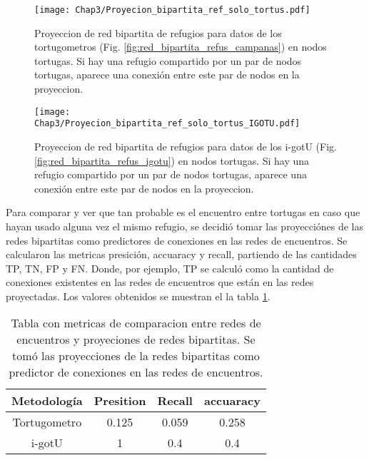 \begin{figure}[ht]
    \begin{center}
        \texttt{[image: Chap3/Proyecion\_bipartita\_ref\_solo\_tortus.pdf]}
        \caption[Proyeccion  de red bipartita de refugios para datos de los tortugometros en nodos tortugas.]{Proyeccion  de red bipartita de refugios para datos de los tortugometros (Fig. \ref{fig:red_bipartita_refus_campanas}) en nodos tortugas. Si hay una refugio compartido por un par de nodos tortugas, aparece una conexión entre este par de nodos en la proyeccion. } 
        \label{fig:proyeccion_red_campanas}
        
        \end{center}
\end{figure} 

\begin{figure}[ht]
    \begin{center}
        \texttt{[image: Chap3/Proyecion\_bipartita\_ref\_solo\_tortus\_IGOTU.pdf]}
        \caption[Proyeccion  de red bipartita de refugios para datos de los tortugometros en nodos tortugas.]{Proyeccion  de red bipartita de refugios para datos de los i-gotU (Fig. \ref{fig:red_bipartita_refus_igotu}) en nodos tortugas. Si hay una refugio compartido por un par de nodos tortugas, aparece una conexión entre este par de nodos en la proyeccion. } 
        \label{fig:proyeccion_red_igotu}
        
        \end{center}
\end{figure} 
Para comparar y ver que tan probable es el encuentro entre tortugas en caso que hayan usado alguna vez el mismo refugio, se decidió tomar las proyecciónes de las redes bipartitas como predictores de conexiones en las redes de encuentros. Se calcularon las metricas presición, accuaracy y recall, partiendo de las cantidades TP, TN, FP y FN. Donde, por ejemplo, TP se calculó como la cantidad de conexiones existentes en las redes de encuentros que están en las redes proyectadas. Los valores obtenidos se muestran el la tabla \ref{tab:metricas_comparacion_redes}.
\begin{table}[ht]
    \centering
    \begin{tabular}{|c|c|c|c|}
        
   \hline
    Metodología  & Presition & Recall & accuaracy \\ \hline
    Tortugometro & 0.125     & 0.059  & 0.258    \\ \hline
    i-gotU       & 1         & 0.4    & 0.4       \\ \hline
    
    \end{tabular}
    \caption[Tabla con metricas de comparacion entre redes de encuentros y proyeciones de redes bipartitas.]{Tabla con metricas de comparacion entre redes de encuentros y proyeciones de redes bipartitas. Se tomó las proyecciones de la redes bipartitas como predictor de conexiones en las redes de encuentros.}
    \label{tab:metricas_comparacion_redes}
\end{table}
